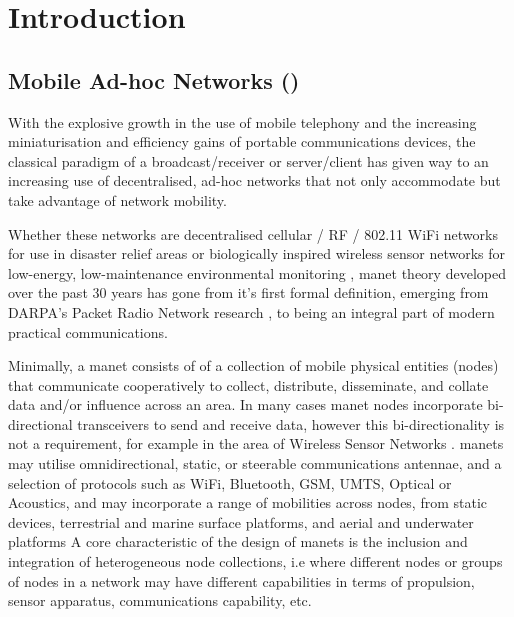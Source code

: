\def\ChapterTitle{Introduction} %

\chapter{\ChapterTitle}
\label{Chapter\thechapter}

\section{Mobile Ad-hoc Networks ()}

With the explosive growth in the use of mobile telephony and the increasing miniaturisation and efficiency gains of portable communications devices, the classical paradigm of a broadcast/receiver or server/client has given way to an increasing use of decentralised, ad-hoc networks that not only accommodate but take advantage of network mobility.

Whether these networks are decentralised cellular / RF / 802.11 WiFi networks for use in disaster relief areas \cite{Milliken2015} or biologically inspired wireless sensor networks for low-energy, low-maintenance environmental monitoring \cite{Nicholson2008}\cite{Selvakennedy2007}, \gls{manet} theory developed over the past 30 years has gone from it's first formal definition, emerging from DARPA's Packet Radio Network research \cite{Jubin1987}, to being an integral part of modern practical communications.

Minimally, a \gls{manet} consists of of a collection of mobile physical entities (nodes) that communicate cooperatively to collect, distribute, disseminate, and collate data and/or influence across an area.
In many cases \gls{manet} nodes incorporate bi-directional transceivers to send and receive data, however this bi-directionality is not a requirement, for example in the area of Wireless Sensor Networks \cite{Akyildiz2002}.
\glspl{manet} may utilise omnidirectional, static, or steerable communications antennae, and a selection of protocols such as WiFi, Bluetooth, GSM, UMTS, Optical or Acoustics, and may incorporate a range of mobilities across nodes, from static devices, terrestrial and marine surface platforms, and aerial and underwater platforms
A core characteristic of the design of \glspl{manet} is the inclusion and integration of heterogeneous node collections, i.e where different nodes or groups of nodes in a network may have different capabilities in terms of propulsion, sensor apparatus, communications capability, etc.

